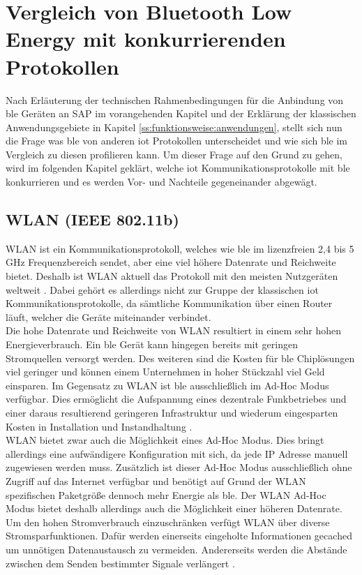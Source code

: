 \section{Vergleich von Bluetooth Low Energy mit konkurrierenden Protokollen}
\label{s:vergleich} 

\noindent Nach Erläuterung der technischen Rahmenbedingungen für die Anbindung von \ac{ble} Geräten an SAP im vorangehenden Kapitel und der Erklärung der klassischen Anwendungsgebiete in Kapitel \ref{ss:funktionsweise:anwendungen}, stellt sich nun die Frage was \ac{ble} von anderen \ac{iot} Protokollen unterscheidet und wie sich \ac{ble} im Vergleich zu diesen profilieren kann. Um dieser Frage auf den Grund zu gehen, wird im folgenden Kapitel geklärt, welche \ac{iot} Kommunikationsprotokolle mit \ac{ble} konkurrieren und es werden Vor- und Nachteile gegeneinander abgewägt.\\ 

\subsection{WLAN (IEEE 802.11b)}
\label{ss:vergleich:wlan}

\noindent WLAN ist ein Kommunikationsprotokoll, welches wie \ac{ble} im lizenzfreien 2,4 bis 5 GHz Frequenzbereich sendet, aber eine viel höhere Datenrate und Reichweite bietet. Deshalb ist WLAN aktuell das Protokoll mit den meisten Nutzgeräten weltweit \cite[Seite 193f]{Gessler15:WNN}. Dabei gehört es allerdings nicht zur Gruppe der klassischen \ac{iot} Kommunikationsprotokolle, da sämtliche Kommunikation über einen Router läuft, welcher die Geräte miteinander verbindet.\\

\noindent Die hohe Datenrate und Reichweite von WLAN resultiert in einem sehr hohen Energieverbrauch. Ein \ac{ble} Gerät kann hingegen bereits mit geringen Stromquellen versorgt werden. Des weiteren sind die Kosten für \ac{ble} Chiplösungen viel geringer und können einem Unternehmen in hoher Stückzahl viel Geld einsparen. Im Gegensatz zu WLAN ist \ac{ble} ausschließlich im Ad-Hoc Modus verfügbar. Dies ermöglicht die Aufspannung eines dezentrale Funkbetriebes und einer daraus resultierend geringeren Infrastruktur und wiederum eingesparten Kosten in Installation und Instandhaltung \cite[Seite 206]{Gessler15:WNN}.\\

\noindent WLAN bietet zwar auch die Möglichkeit eines Ad-Hoc Modus. Dies bringt allerdings eine aufwändigere Konfiguration mit sich, da jede IP Adresse manuell zugewiesen werden muss. Zusätzlich ist dieser Ad-Hoc Modus ausschließlich ohne Zugriff auf das Internet verfügbar und benötigt auf Grund der WLAN spezifischen Paketgröße dennoch mehr Energie als \ac{ble}. Der WLAN Ad-Hoc Modus bietet deshalb allerdings auch die Möglichkeit einer höheren Datenrate. Um den hohen Stromverbrauch einzuschränken verfügt WLAN über diverse Stromsparfunktionen. Dafür werden einerseits eingeholte Informationen gecached um unnötigen Datenaustausch zu vermeiden. Andererseits werden die Abstände zwischen dem Senden bestimmter Signale verlängert \cite[Seite 240ff]{Gessler15:WNN}.\\ 


